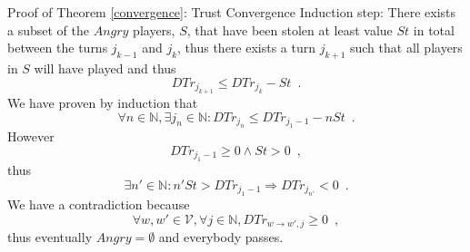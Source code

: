 \begin{sepproof}{Proof of Theorem \ref{convergence}: Trust Convergence}
   Induction step: There exists a subset of the $Angry$ players, $S$, that have been stolen at least value $St$ in total
   between the turns $j_{k-1}$ and $j_k$, thus there exists a turn $j_{k+1}$ such that all players in $S$ will have
   played and thus
   \begin{equation*}
      DTr_{j_{k+1}} \leq DTr_{j_k} - St \enspace.
   \end{equation*}
   We have proven by induction that
   \begin{equation*}
      \forall n \in \mathbb{N}, \exists j_n \in \mathbb{N} : DTr_{j_n} \leq DTr_{j_1-1} - nSt \enspace.
   \end{equation*}
   However
   \begin{equation*}
      DTr_{j_1-1} \geq 0 \wedge St > 0 \enspace,
   \end{equation*}
   thus
   \begin{equation*}
      \exists n' \in \mathbb{N} : n'St > DTr_{j_1-1} \Rightarrow DTr_{j_{n'}} < 0 \enspace.
   \end{equation*}
   We have a contradiction because
   \begin{equation*}
      \forall w,w' \in \mathcal{V}, \forall j \in \mathbb{N}, DTr_{w \rightarrow w', j} \geq 0 \enspace,
   \end{equation*}
   thus eventually $Angry = \emptyset$ and everybody passes.
\end{sepproof}
